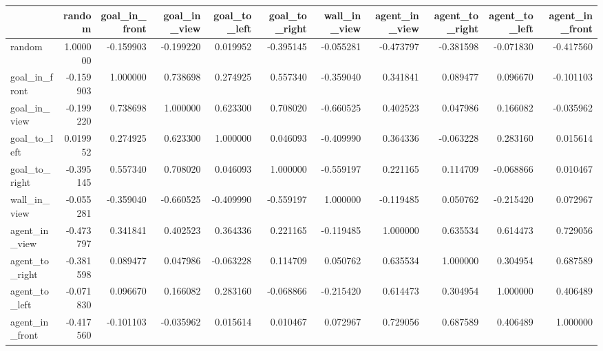 \begin{tabular}{lrrrrrrrrrr}
\toprule
 & random & goal\_in\_front & goal\_in\_view & goal\_to\_left & goal\_to\_right & wall\_in\_view & agent\_in\_view & agent\_to\_right & agent\_to\_left & agent\_in\_front \\
\midrule
random & 1.000000 & -0.159903 & -0.199220 & 0.019952 & -0.395145 & -0.055281 & -0.473797 & -0.381598 & -0.071830 & -0.417560 \\
goal\_in\_front & -0.159903 & 1.000000 & 0.738698 & 0.274925 & 0.557340 & -0.359040 & 0.341841 & 0.089477 & 0.096670 & -0.101103 \\
goal\_in\_view & -0.199220 & 0.738698 & 1.000000 & 0.623300 & 0.708020 & -0.660525 & 0.402523 & 0.047986 & 0.166082 & -0.035962 \\
goal\_to\_left & 0.019952 & 0.274925 & 0.623300 & 1.000000 & 0.046093 & -0.409990 & 0.364336 & -0.063228 & 0.283160 & 0.015614 \\
goal\_to\_right & -0.395145 & 0.557340 & 0.708020 & 0.046093 & 1.000000 & -0.559197 & 0.221165 & 0.114709 & -0.068866 & 0.010467 \\
wall\_in\_view & -0.055281 & -0.359040 & -0.660525 & -0.409990 & -0.559197 & 1.000000 & -0.119485 & 0.050762 & -0.215420 & 0.072967 \\
agent\_in\_view & -0.473797 & 0.341841 & 0.402523 & 0.364336 & 0.221165 & -0.119485 & 1.000000 & 0.635534 & 0.614473 & 0.729056 \\
agent\_to\_right & -0.381598 & 0.089477 & 0.047986 & -0.063228 & 0.114709 & 0.050762 & 0.635534 & 1.000000 & 0.304954 & 0.687589 \\
agent\_to\_left & -0.071830 & 0.096670 & 0.166082 & 0.283160 & -0.068866 & -0.215420 & 0.614473 & 0.304954 & 1.000000 & 0.406489 \\
agent\_in\_front & -0.417560 & -0.101103 & -0.035962 & 0.015614 & 0.010467 & 0.072967 & 0.729056 & 0.687589 & 0.406489 & 1.000000 \\
\bottomrule
\end{tabular}
